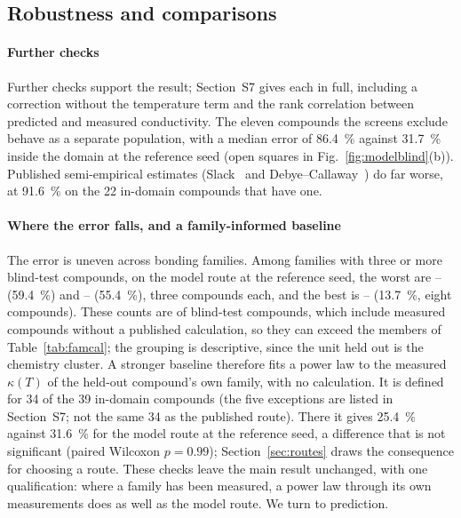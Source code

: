 \subsection{Robustness and comparisons}
\label{sec:robust}

\paragraph{Further checks}
\label{sec:failure}
Further checks support the result; Section~S7 gives each in full, including a correction without
the temperature term and the rank correlation between predicted and measured conductivity. The
eleven compounds the screens exclude behave as a separate population, with a median error of
\SI{86.4}{\percent} against \SI{31.7}{\percent} inside the domain at the reference seed (open
squares in Fig.~\ref{fig:modelblind}(b)). Published semi-empirical estimates
(Slack~\cite{slack1979the} and Debye--Callaway~\cite{callaway1959model}) do far worse, at
\SI{91.6}{\percent} on the \num{22} in-domain compounds that have one.

\paragraph{Where the error falls, and a family-informed baseline}
\label{sec:familynull}
The error is uneven across bonding families. Among families with three or more blind-test
compounds, on the model route at the reference seed, the worst are
-- (\SI{59.4}{\percent}) and -- (\SI{55.4}{\percent}), three compounds
each, and the best is -- (\SI{13.7}{\percent}, eight compounds). These counts are of
blind-test compounds, which include measured compounds without a published calculation, so they can
exceed the members of Table~\ref{tab:famcal}; the grouping is descriptive, since the unit held out is the chemistry cluster. A stronger baseline therefore fits a power law to
the measured $\kappa(T)$ of the held-out compound's own family, with no calculation. It is defined
for \num{34} of the \num{39} in-domain compounds (the five exceptions are listed in Section~S7; not
the same \num{34} as the published route). There it gives \SI{25.4}{\percent} against
\SI{31.6}{\percent} for the model route at the reference seed, a difference that is not significant
(paired Wilcoxon $p=\num{0.99}$); Section~\ref{sec:routes} draws the consequence for choosing a
route. These checks leave the main result unchanged, with one
qualification: where a family has been measured, a power law through its own measurements does as
well as the model route. We turn to prediction.

